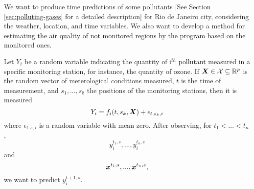 \BL We want to produce time predictions of some pollutants [See Section
\ref{sec:polluting-gases} for a detailed description] for Rio de Janeiro
city, considering the weather, location, and time variables. We also want to
develop a method for estimating the air quality of not monitored regions by
the program based on the monitored ones.

Let $Y_i$ be a random
variable indicating the quantity of i$^{th}$ pollutant measured in a specific
monitoring station, for instance, the quantity of ozone. If $\boldsymbol{X} \in \mathcal{X}
\subseteq \mathbb{R}^{p}$ is the random vector of meterological conditions measured,
$t$ is the time of measurement, and $s_1, ..., s_8$ the positions of the
monitoring stations, then it is measured 
\begin{equation}
    \label{eq:problem definition}
    Y_i = f_i(t, s_k, \boldsymbol{X}) + \epsilon_{t,s_k,i}
\end{equation}
where $\epsilon_{t,s,i}$ is a random variable with mean zero. After
observing, for $t_1 < ... < t_n$,
$$y_i^{t_1,s}, ..., y_i^{t_n,s}$$ 
and 
$$
\boldsymbol{x}^{t_1,s}, ..., \boldsymbol{x}^{t_n,s},
$$
we want to predict $y_i^{t+1, s}$.